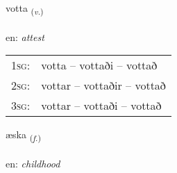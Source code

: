 \documentclass[frontgrid, backgrid]{flacards}\usepackage[]{graphicx}\usepackage[]{xcolor}
\begin{document}
\renewcommand{\flhead}{\vskip5pt \fboxsep=0pt {\small\bfseries\footnotesize Sagnorð | Verb}}
\renewcommand{\fcfoot}{\vskip5pt \fboxsep=0pt \hspace{2pt}{\small\bfseries\footnotesize 3K}}

\renewcommand{\blhead}{\vskip5pt {\small\bfseries\footnotesize Sagnorð | Verb }}
\renewcommand{\bcfoot}{\vskip5pt \hspace{2pt}{\small\bfseries\footnotesize 3K}}


{votta \small{\textsubscript{(\textit{v.})}} \\[1ex] %
\textphonetic{[vɔhta]} \\
en: \emph{attest} \\  [2ex]
\renewcommand*{\arraystretch}{0.8}
\begin{tabular}{p{1cm}l}
\textsc{1sg}: & votta -- vottaði -- vottað \\ 
\textsc{2sg}: & vottar -- vottaðir -- vottað \\ 
\textsc{3sg}: & vottar -- vottaði -- vottað \\ 
\end{tabular}
}

\renewcommand{\flhead}{\vskip5pt \fboxsep=0pt {\small\bfseries\footnotesize Nafnorð | Noun}}
\renewcommand{\fcfoot}{\vskip5pt \fboxsep=0pt \hspace{2pt}{\small\bfseries\footnotesize 3K}}

\renewcommand{\blhead}{\vskip5pt {\small\bfseries\footnotesize Nafnorð | Noun }}
\renewcommand{\bcfoot}{\vskip5pt \hspace{2pt}{\small\bfseries\footnotesize 3K}}


{æska \small{\textsubscript{(\textit{f.})}} \\[1ex] %
\textphonetic{[aiska]} \\
en: \emph{childhood} \\  [2ex]
\renewcommand*{\arraystretch}{0.8}
}
\end{document}
